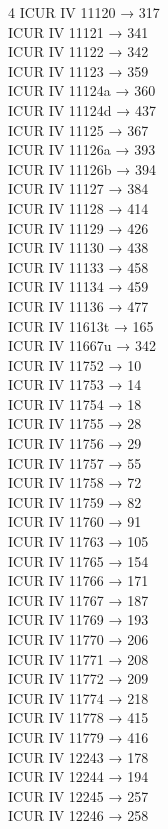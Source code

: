 \begin{multicols}{4}
ICUR IV 11120 → 317\\
ICUR IV 11121 → 341\\
ICUR IV 11122 → 342\\
ICUR IV 11123 → 359\\
ICUR IV 11124a → 360\\
ICUR IV 11124d → 437\\
ICUR IV 11125 → 367\\
ICUR IV 11126a → 393\\
ICUR IV 11126b → 394\\
ICUR IV 11127 → 384\\
ICUR IV 11128 → 414\\
ICUR IV 11129 → 426\\
ICUR IV 11130 → 438\\
ICUR IV 11133 → 458\\
ICUR IV 11134 → 459\\
ICUR IV 11136 → 477\\
ICUR IV 11613t → 165\\
ICUR IV 11667u → 342\\
ICUR IV 11752 → 10\\
ICUR IV 11753 → 14\\
ICUR IV 11754 → 18\\
ICUR IV 11755 → 28\\
ICUR IV 11756 → 29\\
ICUR IV 11757 → 55\\
ICUR IV 11758 → 72\\
ICUR IV 11759 → 82\\
ICUR IV 11760 → 91\\
ICUR IV 11763 → 105\\
ICUR IV 11765 → 154\\
ICUR IV 11766 → 171\\
ICUR IV 11767 → 187\\
ICUR IV 11769 → 193\\
ICUR IV 11770 → 206\\
ICUR IV 11771 → 208\\
ICUR IV 11772 → 209\\
ICUR IV 11774 → 218\\
ICUR IV 11778 → 415\\
ICUR IV 11779 → 416\\
ICUR IV 12243 → 178\\
ICUR IV 12244 → 194\\
ICUR IV 12245 → 257\\
ICUR IV 12246 → 258\\

\end{multicols}

